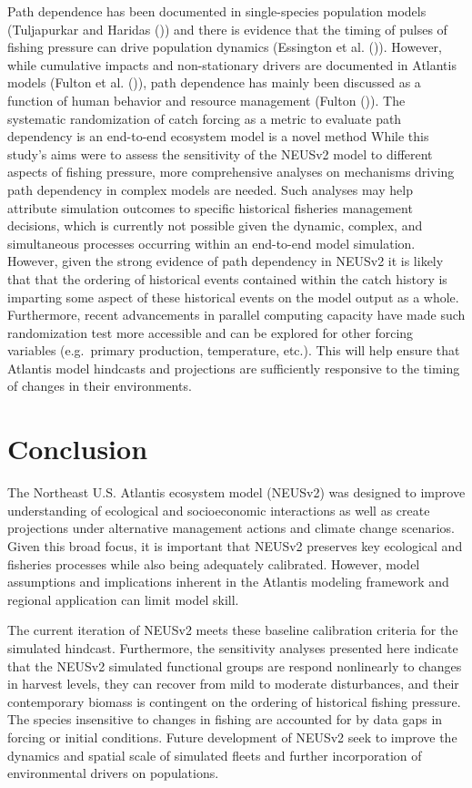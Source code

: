 \documentclass[
]{article}
\begin{document}
Path dependence has been documented in single-species population models (Tuljapurkar and Haridas ()) and there is evidence that the timing of pulses of fishing pressure can drive population dynamics (Essington et al. ()). However, while cumulative impacts and non-stationary drivers are documented in Atlantis models (Fulton et al. ()), path dependence has mainly been discussed as a function of human behavior and resource management (Fulton ()). The systematic randomization of catch forcing as a metric to evaluate path dependency is an end-to-end ecosystem model is a novel method While this study's aims were to assess the sensitivity of the NEUSv2 model to different aspects of fishing pressure, more comprehensive analyses on mechanisms driving path dependency in complex models are needed. Such analyses may help attribute simulation outcomes to specific historical fisheries management decisions, which is currently not possible given the dynamic, complex, and simultaneous processes occurring within an end-to-end model simulation. However, given the strong evidence of path dependency in NEUSv2 it is likely that that the ordering of historical events contained within the catch history is imparting some aspect of these historical events on the model output as a whole. Furthermore, recent advancements in parallel computing capacity have made such randomization test more accessible and can be explored for other forcing variables (e.g.~primary production, temperature, etc.). This will help ensure that Atlantis model hindcasts and projections are sufficiently responsive to the timing of changes in their environments.

\section{Conclusion}\label{conclusion}

The Northeast U.S. Atlantis ecosystem model (NEUSv2) was designed to improve understanding of ecological and socioeconomic interactions as well as create projections under alternative management actions and climate change scenarios. Given this broad focus, it is important that NEUSv2 preserves key ecological and fisheries processes while also being adequately calibrated. However, model assumptions and implications inherent in the Atlantis modeling framework and regional application can limit model skill.

The current iteration of NEUSv2 meets these baseline calibration criteria for the simulated hindcast. Furthermore, the sensitivity analyses presented here indicate that the NEUSv2 simulated functional groups are respond nonlinearly to changes in harvest levels, they can recover from mild to moderate disturbances, and their contemporary biomass is contingent on the ordering of historical fishing pressure. The species insensitive to changes in fishing are accounted for by data gaps in forcing or initial conditions. Future development of NEUSv2 seek to improve the dynamics and spatial scale of simulated fleets and further incorporation of environmental drivers on populations.
\end{document}

